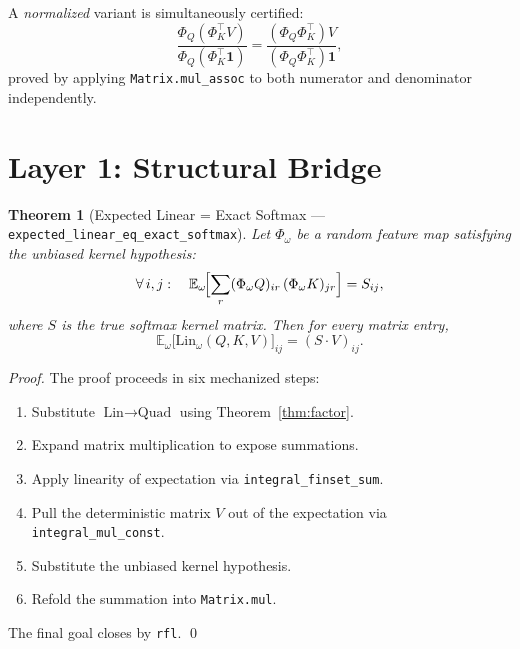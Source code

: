 \documentclass[11pt,a4paper,twocolumn]{article}
\newtheorem{theorem}{Theorem}[section]
\theoremstyle{definition}
\theoremstyle{remark}
\newcommand{\E}{\mathbb{E}}
\newcommand{\leancode}[1]{\texttt{\color{leanblue}#1}}
\begin{document}
A \emph{normalized} variant is simultaneously certified:
\begin{equation}
  \frac{\Phi_Q(\Phi_K^\top V)}{\Phi_Q(\Phi_K^\top \mathbf{1})}
  =
  \frac{(\Phi_Q \Phi_K^\top) V}{(\Phi_Q \Phi_K^\top) \mathbf{1}},
\end{equation}
proved by applying \leancode{Matrix.mul\_assoc} to both numerator and
denominator independently.


\section{Layer 1: Structural Bridge}
\label{sec:layer1}

\begin{theorem}[Expected Linear = Exact Softmax ---
\leancode{expected\_linear\_eq\_exact\_softmax}]
\label{thm:bridge}
Let $\Phi_\omega$ be a random feature map satisfying the \emph{unbiased
kernel hypothesis}:
\begin{equation}
  \forall\, i,j:\quad
  \E_\omega\!\Bigl[\sum_{r} (\Phi_\omega Q)_{ir}\,(\Phi_\omega K)_{jr}\Bigr]
  = S_{ij},
\end{equation}
where $S$ is the true softmax kernel matrix. Then for every matrix entry,
\begin{equation}
  \E_\omega\!\bigl[\mathrm{Lin}_\omega(Q,K,V)\bigr]_{ij}
  = (S \cdot V)_{ij}.
\end{equation}
\end{theorem}

\begin{proof}
The proof proceeds in six mechanized steps:
\begin{enumerate}[nosep,label=\textbf{Step \Alph*:}]
  \item Substitute $\text{Lin} \to \text{Quad}$ using
        Theorem~\ref{thm:factor}.
  \item Expand matrix multiplication to expose summations.
  \item Apply linearity of expectation via
        \leancode{integral\_finset\_sum}.
  \item Pull the deterministic matrix $V$ out of the expectation via
        \leancode{integral\_mul\_const}.
  \item Substitute the unbiased kernel hypothesis.
  \item Refold the summation into \leancode{Matrix.mul}.
\end{enumerate}
The final goal closes by \texttt{rfl}. \qed
\end{proof}
\end{document}
